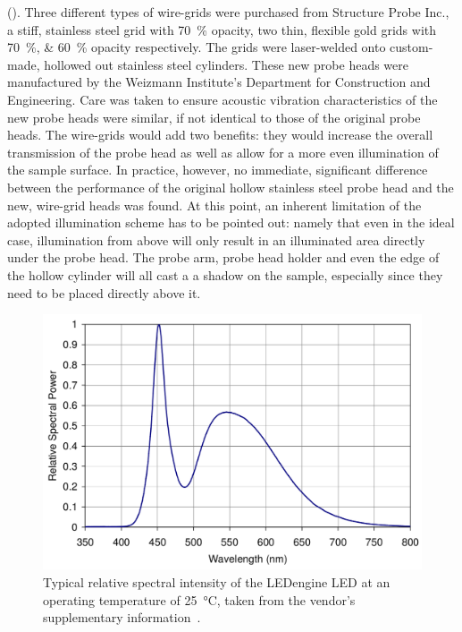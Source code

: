 (\tem{}). Three different types of wire-grids were purchased from Structure Probe Inc., a stiff, stainless steel grid with \SI{70}{\percent} opacity, two thin, flexible gold grids with \SIlist{70;60}{\percent} opacity respectively. The grids were laser-welded onto custom-made, hollowed out stainless steel cylinders. These new probe heads were manufactured by the Weizmann Institute's Department for Construction and Engineering. Care was taken to ensure acoustic vibration characteristics of the new probe heads were similar, if not identical to those of the original \McA{} probe heads. The wire-grids would add two benefits: they would increase the overall transmission of the probe head as well as allow for a more even illumination of the sample surface. In practice, however, no immediate, significant difference between the performance of the original hollow stainless steel probe head and the new, \tem{} wire-grid heads was found. At this point, an inherent limitation of the adopted illumination scheme has to be pointed out: namely that even in the ideal case, illumination from above will only result in an illuminated area directly under the probe head. The probe arm, probe head holder and even the edge of the hollow cylinder will all cast a a shadow on the sample, especially since they need to be placed directly above it.\\
\begin{figure}
\centering
	\includegraphics[width=0.8\linewidth]{./figs/chap2/ledspec}
	\caption[Typical relative spectral intensity of the LEDengine LED at an operating temperature of \SI{25}{\degreeCelsius}.]{Typical relative spectral intensity of the LEDengine LED at an operating temperature of \SI{25}{\degreeCelsius}, taken from the vendor's supplementary information~\cite[p. 10]{ledengin}.}
	\label{fig:ledspec}
\end{figure}
